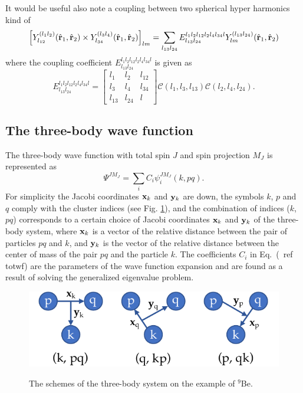 \documentclass[12pt,a4paper,twoside]{article}
\begin{document}
It would be useful also note a coupling between two spherical hyper harmonics kind of
\begin{equation}
\left[ Y^{(l_1l_2)}_{l_{12}}(\hat{{\bf r}}_1,\hat{{\bf r}}_2) \times Y^{(l_3l_4)}_{l_{34}}(\hat{{\bf r}}_1,\hat{{ \bf r}}_2) \right]_{lm}= \sum_{l_{13}l_{24}} {E}^{l_1l_2l_{12}l_2l_4l_{34}l}_{l_{13}l_{24}}  Y^{(l_{13}l_{24})}_{lm}(\hat{{\bf r}}_1,\hat{{\bf r}}_2)
\label{hyperSphTrans}
\end{equation}
where the coupling coefficient ${E}^{l_1l_2l_{12}l_2l_4l_{34}l}_{l_{13}l_{24}}$ is given as
\begin{equation}
{E}^{l_1l_2l_{12}l_2l_4l_{34}l}_{l_{13}l_{24}} = 
\begin{bmatrix}
l_1 & l_2 & l_{12} \\ 
l_3 & l_4 & l_{34} \\ 
l_{13} & l_{24} & l
\end{bmatrix}
\mathcal{C}(l_1,l_3,l_{13})\mathcal{C}(l_2,l_4,l_{24}).
\end{equation}

  

\subsection{The three-body wave function}

The three-body wave function with total spin $ J $ and spin projection $ M_J $ is represented as
 \begin{equation}
 \Psi^{JM_J}= \sum_{i} C_{i} \psi_{i}^{JM_J} \left( k,pq \right).
 \label{totwf}
 \end{equation}
For simplicity the Jacobi coordinates $ {\bf x}_k $ and $ {\bf y}_k $ are down, the symbols $ k $, $ p $ and $ q $ comply with the cluster indices (see Fig. \ref{fig:jacobiSet}), and the combination of indices ($ k $, $ pq $) corresponds to a certain choice of Jacobi coordinates $ {\bf x}_k $ and $ {\bf y}_k $ of the three-body system, where $ {\bf x}_k $ is a vector of the relative distance between the pair of particles $ pq $ and $ k $, and $ {\bf y}_k $ is the vector of the relative distance between the center of mass of the pair $ pq $ and the particle $ k $. 
The coefficients $ C_{i} $ in Eq.~(\ ref {totwf}) are the parameters of the wave function expansion and are found as a result of solving the generalized eigenvalue problem. 

\begin{figure}[b]
\centering
\includegraphics[scale=0.15]{pic1}\\
\caption{The schemes of the three-body system on the example of ${}^9$Be.}
\label{fig:jacobiSet}
\end{figure}
\end{document}
